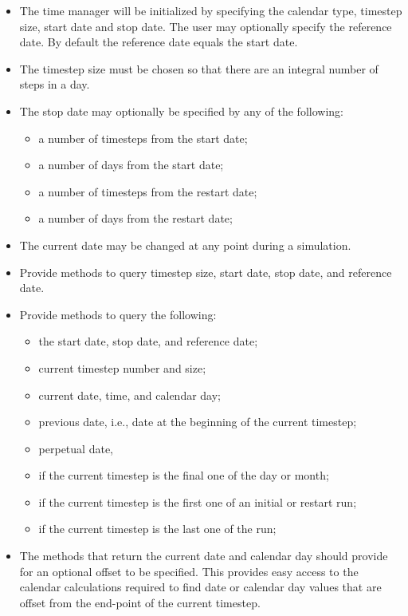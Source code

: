 \documentclass[12pt]{article}
\begin{document}
\begin{itemize}

\item
The time manager will be initialized by specifying the calendar type,
timestep size, start date and stop date.  The user may optionally specify
the reference date.  By default the reference date equals the start date.

\item
The timestep size must be chosen so that there are an integral number of
steps in a day.  

\item
The stop date may optionally be specified by any of the following:
\begin{itemize}
\item a number of timesteps from the start date;
\item a number of days from the start date;
\item a number of timesteps from the restart date;
\item a number of days from the restart date;
\end{itemize}

\item
The current date may be changed at any point during a simulation.

\item
Provide methods to query timestep size, start date, stop date, and
reference date.

\item
Provide methods to query the following:
\begin{itemize}
\item the start date, stop date, and reference date;
\item current timestep number and size;
\item current date, time, and calendar day;
\item previous date, i.e., date at the beginning of the current timestep;
\item perpetual date,
\item if the current timestep is the final one of the day or month;
\item if the current timestep is the first one of an initial or restart run;
\item if the current timestep is the last one of the run;
\end{itemize}

\item
The methods that return the current date and calendar day should provide
for an optional offset to be specified.  This provides easy access to the
calendar calculations required to find date or calendar day values that
are offset from the end-point of the current timestep.


\end{itemize}
\end{document}
